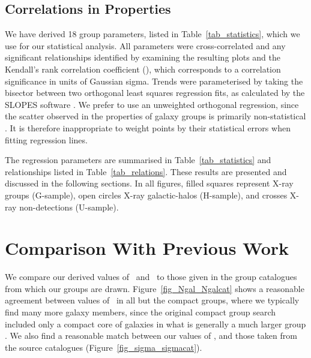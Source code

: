 \documentclass[usenatbib]{mn2e}
\begin{document}



\subsection{Correlations in Properties}
\label{sec_relations}

We have derived 18 group parameters, listed in Table~\ref{tab_statistics}, which
we use for our statistical analysis.  All parameters were cross-correlated and
any significant relationships identified by examining the resulting plots and the
Kendall's rank correlation coefficient (\K), which corresponds to a correlation
significance in units of Gaussian sigma.  Trends were parameterised by taking the
bisector between two orthogonal least squares regression fits, as calculated by
the SLOPES software \citep{feigelson92}. We prefer to use an unweighted
orthogonal regression, since the scatter observed in the properties of galaxy
groups is primarily non-statistical \citep{helsdon00b}. It is therefore
inappropriate to weight points by their statistical errors when fitting
regression lines.

The regression parameters are summarised in Table~\ref{tab_statistics} and
relationships listed in Table~\ref{tab_relations}.  These results are presented
and discussed in the following sections.  In all figures, filled squares
represent X-ray groups (G-sample), open circles X-ray galactic-halos (H-sample),
and crosses X-ray non-detections (U-sample).






\section{Comparison With Previous Work}
\label{sec_comp}

We compare our derived values of \Ngal\ and \sigmav\ to those given in the group
catalogues from which our groups are drawn.  Figure~\ref{fig_Ngal_Ngalcat} shows
a reasonable agreement between values of \Ngal\ in all but the compact groups,
where we typically find many more galaxy members, since the original compact
group search included only a compact core of galaxies in what is generally a much
larger group \citep[e.g][]{zabludoff98}.  We also find a reasonable match between
our values of \sigmav, and those taken from the source catalogues
(Figure~\ref{fig_sigma_sigmacat}).
\end{document}
